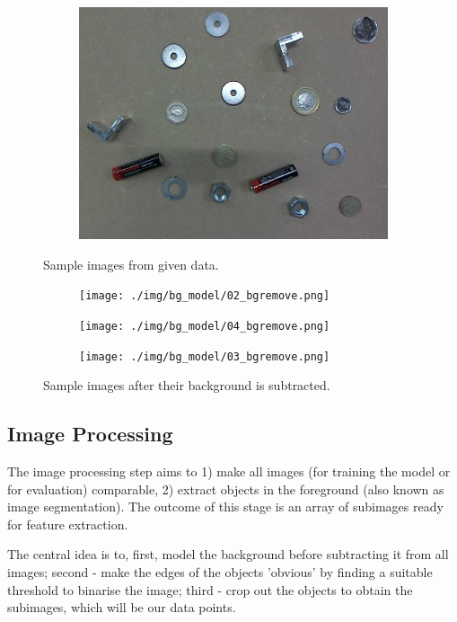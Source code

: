 \documentclass[main.tex]{subfiles}
\begin{document}
\begin{figure}[!h]
\begin{subfigure}[b]{.3\textwidth}
    \includegraphics[width=\textwidth]{./img/sample_fig/03.jpg}
  \end{subfigure}
  \caption{Sample images from given data.}
  \label{montage_data}
\end{figure}
\begin{figure}[!h]
  \centering
  \begin{subfigure}[b]{.3\textwidth}
    \centering
    \texttt{[image: ./img/bg\_model/02\_bgremove.png]}
  \end{subfigure}
  \begin{subfigure}[b]{.3\textwidth}
    \centering
    \texttt{[image: ./img/bg\_model/04\_bgremove.png]}
  \end{subfigure}
  \begin{subfigure}[b]{.3\textwidth}
    \centering
    \texttt{[image: ./img/bg\_model/03\_bgremove.png]}
  \end{subfigure}
  \caption{Sample images after their background is subtracted.}
  \label{montage_data_bgremove}
\end{figure}


\subsection*{Image Processing}
The image processing step aims to 1) make all images (for training the model or for evaluation) comparable, 2) extract objects in the foreground (also known as image segmentation). The outcome of this stage is an array of subimages ready for feature extraction.

The central idea is to, first, model the background before subtracting it from all images; second - make the edges of the objects 'obvious' by finding a suitable threshold to binarise the image; third - crop out the objects to obtain the subimages, which will be our data points.
\end{document}
